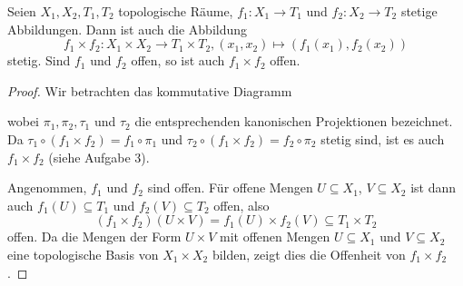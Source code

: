 \documentclass[a4paper,10pt]{article}
\begin{document}
\begin{lem}\label{lem: Funktionsprodukt}
 Seien $X_1, X_2, T_1, T_2$ topologische Räume, $f_1 : X_1 \to T_1$ und $f_2 : X_2 \to T_2$ stetige Abbildungen. Dann ist auch die Abbildung
 \[
  f_1 \times f_2 : X_1 \times X_2 \to T_1 \times T_2, (x_1, x_2) \mapsto (f_1(x_1), f_2(x_2))
 \]
 stetig. Sind $f_1$ und $f_2$ offen, so ist auch $f_1 \times f_2$ offen.
\end{lem}
\begin{proof}
 Wir betrachten das kommutative Diagramm
 \begin{center}
 \end{center}
 wobei $\pi_1, \pi_2, \tau_1$ und $\tau_2$ die entsprechenden kanonischen Projektionen bezeichnet. Da $\tau_1 \circ (f_1 \times f_2) = f_1 \circ \pi_1$ und $\tau_2 \circ (f_1 \times f_2) = f_2 \circ \pi_2$ stetig sind, ist es auch $f_1 \times f_2$ (siehe Aufgabe 3).
 
 Angenommen, $f_1$ und $f_2$ sind offen. Für offene Mengen $U \subseteq X_1$, $V \subseteq X_2$ ist dann auch $f_1(U) \subseteq T_1$ und $f_2(V) \subseteq T_2$ offen, also
 \[
  (f_1 \times f_2)(U \times V) = f_1(U) \times f_2(V) \subseteq T_1 \times T_2
 \]
 offen. Da die Mengen der Form $U \times V$ mit offenen Mengen $U \subseteq X_1$ und $V \subseteq X_2$ eine topologische Basis von $X_1 \times X_2$ bilden, zeigt dies die Offenheit von $f_1 \times f_2$.
\end{proof}
\end{document}

